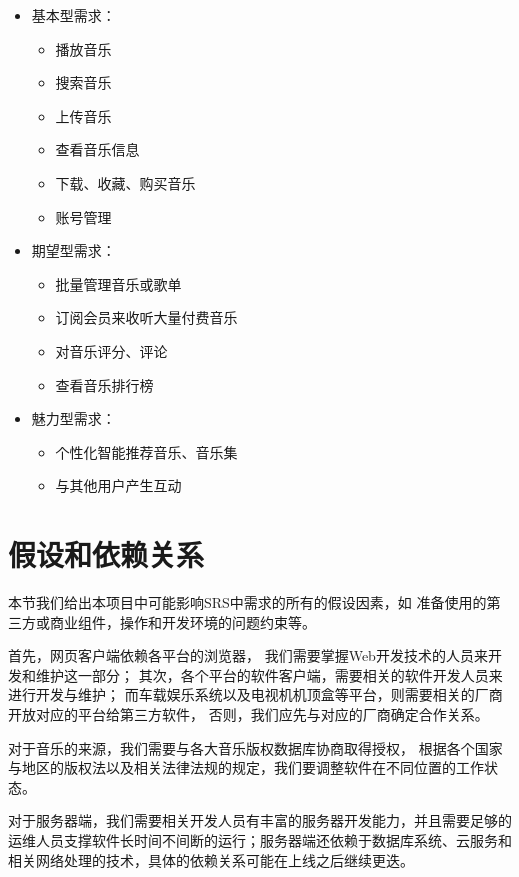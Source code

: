 \begin{itemize}
    \item 基本型需求：
    \begin{itemize}
        \item 播放音乐
        \item 搜索音乐
        \item 上传音乐
        \item 查看音乐信息
        \item 下载、收藏、购买音乐
        \item 账号管理
    \end{itemize}
    \item 期望型需求：
    \begin{itemize}
        \item 批量管理音乐或歌单
        \item 订阅会员来收听大量付费音乐
        \item 对音乐评分、评论
        \item 查看音乐排行榜
    \end{itemize}
    \item 魅力型需求：
    \begin{itemize}
        \item 个性化智能推荐音乐、音乐集
        \item 与其他用户产生互动
    \end{itemize}
\end{itemize}
\iffalse
\R{ 
随着社交网络进一步渗透到中国以及全世界人们的生活的方方面面，我们
作为一款音乐播放系统，也需要拥抱变化，改善体验，迎接挑战。因此，经过需
求修订，我们加入了围绕着社交网络的一系列项目目标，如：好友系统、私人空
间的分享、评论、点赞系统。}

\R {
通过市场调查，我们可以发现 K 歌功能收到了中国
市场的男女老少的全方面的欢迎，所以，我们也将这些需求放置在我们项目的目
标之中。
}
\fi
\section{假设和依赖关系}

本节我们给出本项目中可能影响SRS中需求的所有的假设因素，如
    准备使用的第三方或商业组件，操作和开发环境的问题约束等。

首先，网页客户端依赖各平台的浏览器，
    我们需要掌握Web开发技术的人员来开发和维护这一部分；
其次，各个平台的软件客户端，需要相关的软件开发人员来进行开发与维护；
而车载娱乐系统以及电视机机顶盒等平台，则需要相关的厂商开放对应的平台给第三方软件，
    否则，我们应先与对应的厂商确定合作关系。

对于音乐的来源，我们需要与各大音乐版权数据库协商取得授权，
    根据各个国家与地区的版权法以及相关法律法规的规定，我们要调整软件在不同位置的工作状态。

对于服务器端，我们需要相关开发人员有丰富的服务器开发能力，并且需要足够的运维人员支撑软件长时间不间断的运行；服务器端还依赖于数据库系统、云服务和相关网络处理的技术，具体的依赖关系可能在上线之后继续更迭。
